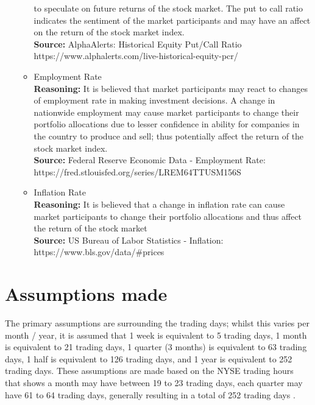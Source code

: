 \begin{itemize}
\begin{itemize}
        to speculate on future returns of the stock market. The put to call ratio indicates the sentiment
        of the market participants and may have an affect on the return of the stock market index.\\
        \textbf{Source:} AlphaAlerts: Historical Equity Put/Call Ratio\\
        https://www.alphalerts.com/live-historical-equity-pcr/
        \item Employment Rate\\
        \textbf{Reasoning:} It is believed that market participants may react to changes of employment
        rate in making investment decisions. A change in nationwide employment may cause market participants
        to change their portfolio allocations due to lesser confidence in ability for companies in the country
        to produce and sell; thus potentially affect the return of the stock market index.\\
        \textbf{Source:} Federal Reserve Economic Data - Employment Rate:\\
        https://fred.stlouisfed.org/series/LREM64TTUSM156S
        \item Inflation Rate\\
        \textbf{Reasoning:} It is believed that a change in inflation rate can cause market participants
        to change their portfolio allocations and thus affect the return of the stock market\\
        \textbf{Source:} US Bureau of Labor Statistics - Inflation:\\
        https://www.bls.gov/data/\#prices
    \end{itemize}
\end{itemize}


\section{Assumptions made}
The primary assumptions are surrounding the trading days; whilst this varies per month / year, it is assumed
that 1 week is equivalent to 5 trading days, 1 month is equivalent to 21 trading days, 1 quarter (3 months)
is equivalent to 63 trading days, 1 half is equivalent to 126 trading days, and 1 year is equivalent to 252
trading days. These assumptions are made based on the NYSE trading hours that shows a month may have
between 19 to 23 trading days, each quarter may have 61 to 64 trading days, generally resulting in a total
of 252 trading days \parencite{nyse_2020}.

